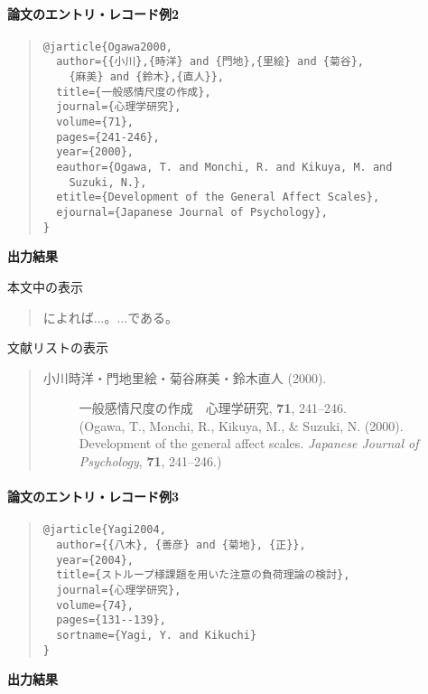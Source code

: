 \documentclass[12pt]{ltjsarticle}
\begin{document}
\paragraph{論文のエントリ・レコード例2}

\begin{quote}
\begin{verbatim}
@jarticle{Ogawa2000,
  author={{小川},{時洋} and {門地},{里絵} and {菊谷},
    {麻美} and {鈴木},{直人}},
  title={一般感情尺度の作成},
  journal={心理学研究},
  volume={71},
  pages={241-246},
  year={2000},
  eauthor={Ogawa, T. and Monchi, R. and Kikuya, M. and 
    Suzuki, N.},
  etitle={Development of the General Affect Scales},
  ejournal={Japanese Journal of Psychology},
}
\end{verbatim}
\end{quote}


\textbf{出力結果}

本文中の表示
\begin{quote}
\textcite{Ogawa2000}によれば...。...である\parencite{Ogawa2000}。
\end{quote}


文献リストの表示

\begin{quote}
\begin{description}
  \item[\textrm{小川時洋・門地里絵・菊谷麻美・鈴木直人 (2000).}] 一般感情尺度の作成　心理学研究, \textbf{71}, 241--246.\\
(Ogawa, T., Monchi, R., Kikuya, M., \& Suzuki, N. (2000). Development of the general affect scales. \textit{Japanese Journal of Psychology}, \textbf{71}, 241--246.)\end{description}
\end{quote}


\paragraph{論文のエントリ・レコード例3}

\begin{quote}
\begin{verbatim}
@jarticle{Yagi2004,
  author={{八木}, {善彦} and {菊地}, {正}},
  year={2004},
  title={ストループ様課題を用いた注意の負荷理論の検討},
  journal={心理学研究},
  volume={74},
  pages={131--139},
  sortname={Yagi, Y. and Kikuchi}
}
\end{verbatim}
\end{quote}


\textbf{出力結果}
\end{document}
